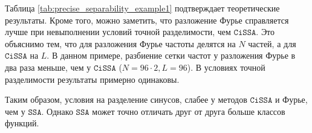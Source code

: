 \documentclass[12pt, specialist, subf
]{disser}
\theoremstyle{definition}
\newcommand{\SSA}{\texttt{SSA}}
\newcommand{\CISSA}{\texttt{CiSSA}}
\newcommand{\TS}{\mathsf{X}}
\begin{document}
Таблица \ref{tab:precise_separability_example1} подтверждает теоретические результаты. Кроме того, можно заметить, что разложение Фурье справляется лучше при невыполнении условий точной разделимости, чем $\CISSA$. Это объяснимо тем, что для разложения Фурье частоты делятся на $N$ частей, а для $\CISSA$ на $L$. В данном примере, разбиение сетки частот у разложения Фурье в два раза меньше, чем у $\CISSA$ ($N = 96 \cdot 2, L = 96$). В условиях точной разделимости результаты примерно одинаковы.

Таким образом, условия на разделение синусов, слабее у методов $\CISSA$ и Фурье, чем у $\SSA$. Однако $\SSA$ может точно отличать друг от друга больше классов функций.





%		
%
%		
\end{document}
